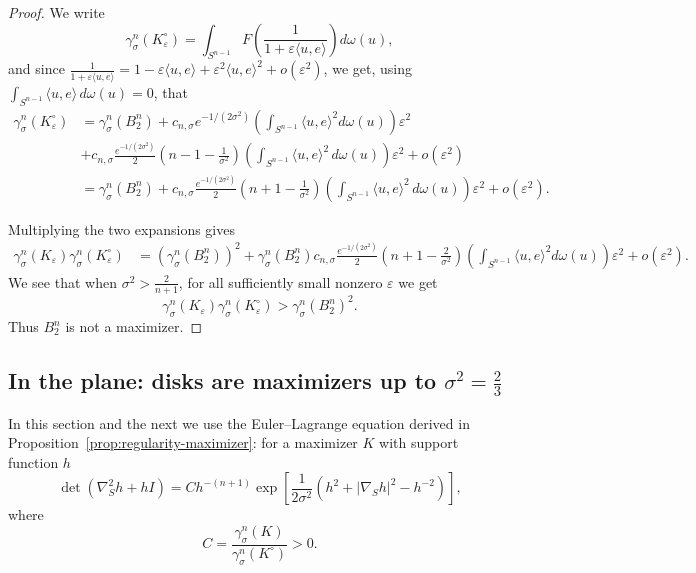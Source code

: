 \documentclass[12pt,oneside,reqno]{amsart}
\numberwithin{equation}{section}
\theoremstyle{remark}
\newcommand{\eps}{\varepsilon}
\begin{document}
\begin{proof}
We write 
\[
        \gamma_\sigma^n(K_\eps^\circ)
        =
        \int_{ S^{n-1}}
        F\left(\frac1{1+\eps\langle u,e\rangle}\right)
        d\omega(u),\]
and since  $\frac1{1+\eps\langle u,e\rangle}
        =
        1-\eps\langle u,e\rangle
        +\eps^2\langle u,e\rangle^2
        +
        o(\eps^2)$, we get, using
\(\int_{S^{n-1}}\langle u,e\rangle\,d\omega(u)=0\), that
\[
\begin{aligned}
        \gamma_\sigma^n(K_\eps^\circ)
        &=
        \gamma_\sigma^n(B_2^n)
        +
        c_{n,\sigma}e^{-1/(2\sigma^2)} \left(\int_{  S^{n-1}}\langle u,e\rangle^2 d\omega(u)\right)\eps^2
        \\&+
      c_{n,\sigma}\frac{e^{-1/(2\sigma^2)}}{2} 
        \left(n-1-\frac1{\sigma^2}\right)\left(\int_{  S^{n-1}}\langle u,e\rangle^2\,d\omega(u)\right)\eps^2
        +
        o(\eps^2)  \\
        &=
        \gamma_\sigma^n(B_2^n)
        +
        c_{n,\sigma}\frac{e^{-1/(2\sigma^2)}}{2}
        \left(n+1-\frac1{\sigma^2}\right)\left(\int_{ S^{n-1}}\langle u,e\rangle^2\,d\omega(u)\right)\eps^2
        +
        o(\eps^2).
\end{aligned}
\]

Multiplying the two expansions gives
\[
\begin{aligned}
        \gamma_\sigma^n(K_\eps)
        \gamma_\sigma^n(K_\eps^\circ)
        &=
        (\gamma_\sigma^n(B_2^n))^2
        +
        \gamma_\sigma^n(B_2^n) c_{n,\sigma}\frac{ e^{-1/(2\sigma^2)}}{2}
        \left(n+1-\frac2{\sigma^2}\right)
        \left(\int_{  S^{n-1}}\langle u,e\rangle^2 d\omega(u)\right)\eps^2
        +
        o(\eps^2).
\end{aligned}
\]
We see that when $\sigma^2>\frac{2}{n+1}$, for all sufficiently small nonzero \(\eps\) we get
\[
        \gamma_\sigma^n(K_\eps)\gamma_\sigma^n(K_\eps^\circ)
        >
        \gamma_\sigma^n(B_2^n)^2 .
\]
Thus \(B_2^n\) is not a maximizer.
\end{proof}

\subsection{In the plane: disks are maximizers up to $\sigma^2 = \frac{2}{3}$}

In this section and the next we use the Euler--Lagrange equation derived in Proposition~\ref{prop:regularity-maximizer}: for a maximizer \(K\) with support function \(h\) 
\begin{equation}\label{EL}
 \det(\nabla_S^2 h+hI)=
        C h^{-(n+1)}
        \exp\left[
        \frac{1}{2\sigma^2}
        \left(h^2+|\nabla_Sh|^2-h^{-2}\right)
        \right],
\end{equation}
where
\[
        C=\frac{\gamma_\sigma^n(K)}{\gamma_\sigma^n(K^\circ)}>0.
\]
\end{document}
